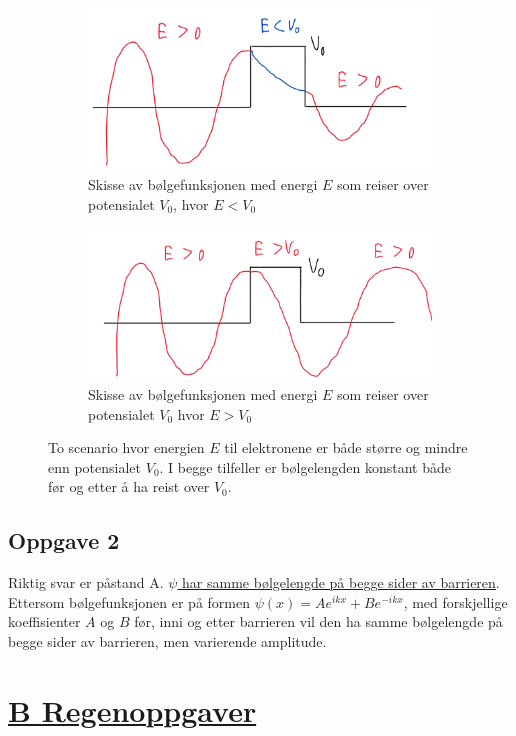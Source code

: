 \documentclass{article}
\begin{document}
\begin{figure}[h!]
    \centering
    \begin{subfigure}{.4\textwidth}
      \centering
      \includegraphics[width = \textwidth]{1.e.1.png}
      \caption{Skisse av bølgefunksjonen med energi $E$ som reiser over potensialet $V_0$, hvor $E<V_0$}
      \label{subfig: 1.e.1}
    \end{subfigure}
    \hfill
    \begin{subfigure}{.4\textwidth}
      \centering
      \includegraphics[width = \textwidth]{1.e.2.png}
      \caption{Skisse av bølgefunksjonen med energi $E$ som reiser over potensialet $V_0$ hvor $E>V_0$}
      \label{subfig: 1.e.2}
    \end{subfigure}
    \hfill
    \caption{To scenario hvor energien $E$ til elektronene er både større og mindre enn potensialet $V_0$. I begge tilfeller er bølgelengden konstant både før og etter å ha reist over $V_0$.}
    \label{fig: 1.e}
\end{figure}


\subsection*{Oppgave 2}
Riktig svar er påstand A. \underline{$ψ$ har samme bølgelengde på begge sider av barrieren}. 
Ettersom bølgefunksjonen er på formen $ψ(x) = Ae^{ikx} + Be^{-ikx}$, med forskjellige koeffisienter $A$ og $B$ før, inni og etter barrieren vil den ha samme bølgelengde på begge sider av barrieren, men varierende amplitude. 


\section*{\underline{B Regenoppgaver}}
\end{document}
